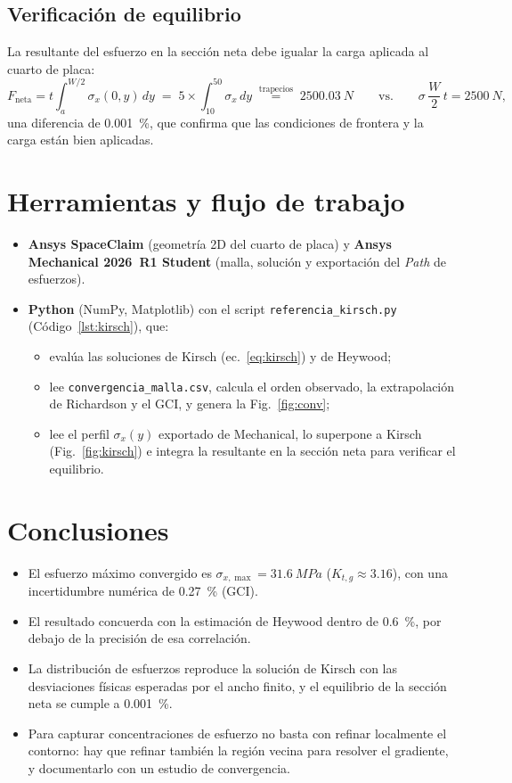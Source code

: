 \documentclass[11pt,letterpaper]{article}
\begin{document}
\subsection{Verificación de equilibrio}
La resultante del esfuerzo en la sección neta debe igualar la carga aplicada al cuarto de placa:
\begin{equation}
F_{\text{neta}}=t\int_{a}^{W/2}\sigma_x(0,y)\,dy \;=\; 5\times\int_{10}^{50}\sigma_x\,dy\;\overset{\text{trapecios}}{=}\;\SI{2500.03}{N}
\qquad\text{vs.}\qquad \sigma\,\frac{W}{2}\,t=\SI{2500}{N},
\end{equation}
una diferencia de \SI{0.001}{\%}, que confirma que las condiciones de frontera y la carga están bien aplicadas.

\section{Herramientas y flujo de trabajo}
\begin{itemize}
\item \textbf{Ansys SpaceClaim} (geometría 2D del cuarto de placa) y \textbf{Ansys Mechanical 2026~R1 Student} (malla, solución y exportación del \emph{Path} de esfuerzos).
\item \textbf{Python} (NumPy, Matplotlib) con el script \texttt{referencia\_kirsch.py} (Código~\ref{lst:kirsch}), que:
  \begin{itemize}
  \item evalúa las soluciones de Kirsch (ec.~\ref{eq:kirsch}) y de Heywood;
  \item lee \texttt{convergencia\_malla.csv}, calcula el orden observado, la extrapolación de Richardson y el GCI, y genera la Fig.~\ref{fig:conv};
  \item lee el perfil $\sigma_x(y)$ exportado de Mechanical, lo superpone a Kirsch (Fig.~\ref{fig:kirsch}) e integra la resultante en la sección neta para verificar el equilibrio.
  \end{itemize}
\end{itemize}

\section{Conclusiones}
\begin{itemize}
\item El esfuerzo máximo convergido es $\sigma_{x,\max}=\SI{31.6}{MPa}$ ($K_{t,g}\approx3.16$), con una incertidumbre numérica de \SI{0.27}{\%} (GCI).
\item El resultado concuerda con la estimación de Heywood dentro de \SI{0.6}{\%}, por debajo de la precisión de esa correlación.
\item La distribución de esfuerzos reproduce la solución de Kirsch con las desviaciones físicas esperadas por el ancho finito, y el equilibrio de la sección neta se cumple a \SI{0.001}{\%}.
\item Para capturar concentraciones de esfuerzo no basta con refinar localmente el contorno: hay que refinar también la región vecina para resolver el gradiente, y documentarlo con un estudio de convergencia.
\end{itemize}
\end{document}
